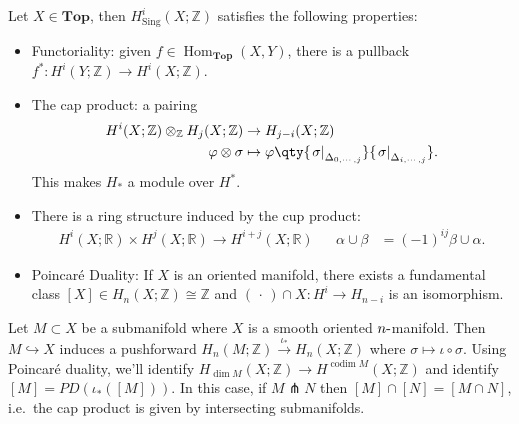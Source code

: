 \begin{theorem}

Let \(X\in {\mathbf{Top}}\), then
\(H_{{\operatorname{Sing}}}^i(X; {\mathbb{Z}})\) satisfies the following
properties:

\begin{itemize}
\item
  Functoriality: given
  \(f\in {\operatorname{Hom}}_{\mathbf{Top}}(X, Y)\), there is a
  pullback \(f^*: H^i(Y; {\mathbb{Z}}) \to H^i(X; {\mathbb{Z}})\).
\item
  The cap product: a pairing
  \begin{align*}
  H^i(X; {\mathbb{Z}}) \otimes_{\mathbb{Z}}H_j(X; {\mathbb{Z}}) &\to H_{j-i}(X; {\mathbb{Z}}) \\
  \varphi\otimes\sigma &\mapsto \varphi\qty{{ \left.{{\sigma}} \right|_{{\Delta_{0, \cdots, j}}} }} { \left.{{ \sigma}} \right|_{{\Delta_{i, \cdots, j}}} }
  .\end{align*}
  This makes \(H_*\) a module over \(H^*\).
\item
  There is a ring structure induced by the cup product:
  \begin{align*}
  H^i(X; {\mathbb{R}}) \times H^j(X; {\mathbb{R}})\to H^{i+j}(X; {\mathbb{R}}) && \alpha\cup \beta &= (-1)^{ij} \beta \cup \alpha
  .\end{align*}
\item
  Poincaré Duality: If \(X\) is an oriented manifold, there exists a
  fundamental class
  \([X] \in H_{n}(X; {\mathbb{Z}}) \cong {\mathbb{Z}}\) and
  \(({\,\cdot\,})\cap X: H^i \to H_{n-i}\) is an isomorphism.
\end{itemize}

\end{theorem}

\begin{remark}

Let \(M \subset X\) be a submanifold where \(X\) is a smooth oriented
\(n{\hbox{-}}\)manifold. Then \(M \hookrightarrow X\) induces a
pushforward
\(H_n(M; {\mathbb{Z}}) \xrightarrow{\iota_*} H_n(X; {\mathbb{Z}})\)
where \(\sigma \mapsto \iota \circ \sigma\). Using Poincaré duality,
we'll identify
\(H_{\dim M}(X; {\mathbb{Z}}) \to H^{\operatorname{codim}M}(X; {\mathbb{Z}})\)
and identify \([M] = PD( \iota_*( [M]))\). In this case, if
\(M\pitchfork N\) then \([M] \cap [N] = [M \cap N]\), i.e.~the cap
product is given by intersecting submanifolds.

\end{remark}

